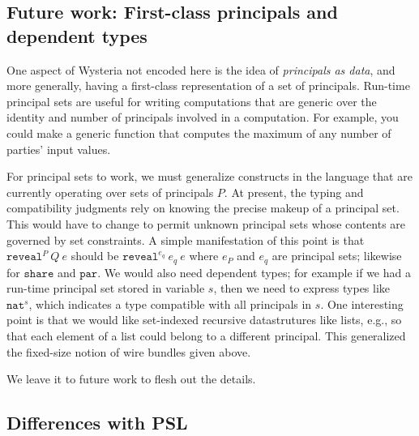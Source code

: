 \documentclass[10pt]{article}
\newcommand{\kw}[1]{\ensuremath{\mathtt{#1}}}
\newcommand{\tnat}{\ensuremath{\mathtt{nat}}}
\newcommand{\ereveal}[3]{\ensuremath{\kw{reveal}^{#1}~{#2}~{#3}}}
\begin{document}
\subsection{Future work: First-class principals and dependent types}

One aspect of Wysteria not encoded here is the idea of
\emph{principals as data}, and more generally, having a first-class
representation of a set of principals. Run-time principal sets are
useful for writing computations that are generic over the identity and
number of principals involved in a computation. For example, you could
make a generic function that computes the maximum of any number of
parties' input values.

For principal sets to work, we must generalize constructs in the
language that are currently operating over sets of principals $P$. At
present, the typing and compatibility judgments rely on knowing the
precise makeup of a principal set. This would have to change to permit
unknown principal sets whose contents are governed by set
constraints. A simple manifestation of this point is that
$\ereveal{P}{Q}{e}$ should be $\ereveal{e_q}{e_q}{e}$
where $e_P$ and $e_q$ are principal sets; likewise for $\kw{share}$
and $\kw{par}$. We would also need dependent types; for example if we
had a run-time principal set stored in variable $s$, then we need to
express types like $\tnat^s$, which indicates a type compatible with
all principals in $s$. One interesting point is that we would like
set-indexed recursive datastrutures like lists, e.g., so that each
element of a list could belong to a different principal. This
generalized the fixed-size notion of wire bundles given above.

We leave it to future work to flesh out the details. 

\subsection{Differences with PSL}
\end{document}

